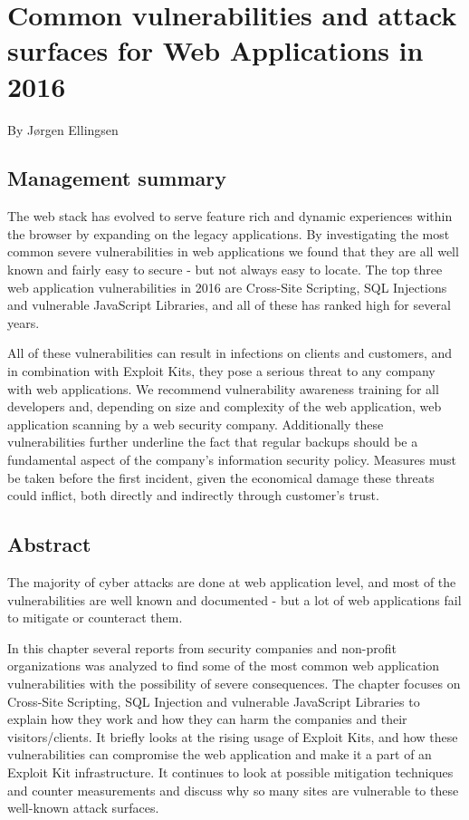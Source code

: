 \chapter[Web Application vulnerabilities in 2016]{Common vulnerabilities and attack surfaces for Web Applications in 2016}
\small{By J{\o}rgen Ellingsen}
\section*{Management summary}
The web stack has evolved to serve feature rich and dynamic experiences within the browser by expanding on the legacy applications. By investigating the most common severe vulnerabilities in web applications we found that they are all well known and fairly easy to secure - but not always easy to locate. The top three web application vulnerabilities in 2016 are Cross-Site Scripting, SQL Injections and vulnerable JavaScript Libraries, and all of these has ranked high for several years.

All of these vulnerabilities can result in infections on clients and customers, and in combination with Exploit Kits, they pose a serious threat to any company with web applications. We recommend vulnerability awareness training for all developers and, depending on size and complexity of the web application, web application scanning by a web security company. Additionally these vulnerabilities further underline the fact that regular backups should be a fundamental aspect of the company's information security policy. Measures must be taken before the first incident, given the economical damage these threats could inflict, both directly and indirectly through customer's trust.
\section*{Abstract}
The majority of cyber attacks are done at web application level, and most of the vulnerabilities are well known and documented - but a lot of web applications fail to mitigate or counteract them.

In this chapter several reports from security companies and non-profit organizations was analyzed to find some of the most common web application vulnerabilities with the possibility of severe consequences. The chapter focuses on Cross-Site Scripting, SQL Injection and vulnerable JavaScript Libraries to explain how they work and how they can harm the companies and their visitors/clients. It briefly looks at the rising usage of Exploit Kits, and how these vulnerabilities can compromise the web application and make it a part of an Exploit Kit infrastructure. It continues to look at possible mitigation techniques and counter measurements and discuss why so many sites are vulnerable to these well-known attack surfaces.
